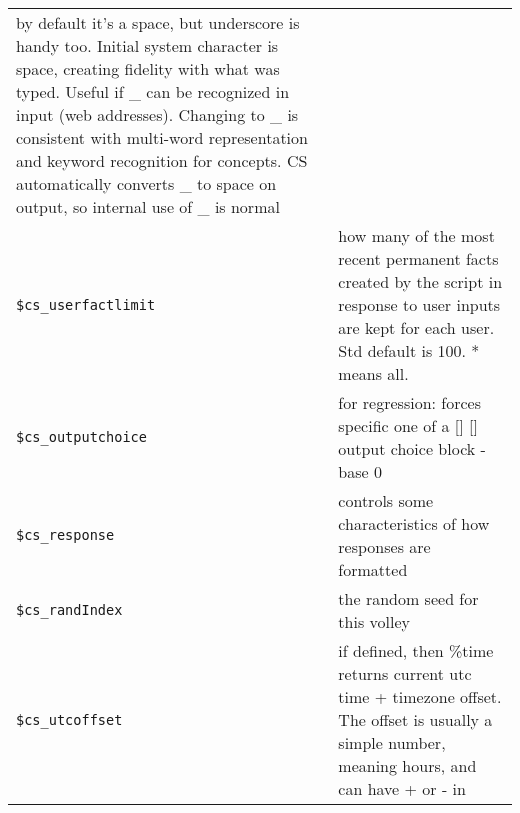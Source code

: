 \documentclass[]{article}
\begin{document}
\begin{longtable}[]{@{}ll@{}}
\begin{minipage}[t]{0.10\columnwidth}
by default it's a space, but underscore is handy too. Initial system
character is space, creating fidelity with what was typed. Useful if \_
can be recognized in input (web addresses). Changing to \_ is consistent
with multi-word representation and keyword recognition for concepts. CS
automatically converts \_ to space on output, so internal use of \_ is
normal\strut
\end{minipage}\tabularnewline
\begin{minipage}[t]{0.26\columnwidth}\raggedright\strut
\texttt{\$cs\_userfactlimit}\strut
\end{minipage} & \begin{minipage}[t]{0.10\columnwidth}\raggedright\strut
how many of the most recent permanent facts created by the script in
response to user inputs are kept for each user. Std default is 100. *
means all.\strut
\end{minipage}\tabularnewline
\begin{minipage}[t]{0.26\columnwidth}\raggedright\strut
\texttt{\$cs\_outputchoice}\strut
\end{minipage} & \begin{minipage}[t]{0.10\columnwidth}\raggedright\strut
for regression: forces specific one of a {[}{]} {[}{]} output choice
block - base 0\strut
\end{minipage}\tabularnewline
\begin{minipage}[t]{0.26\columnwidth}\raggedright\strut
\texttt{\$cs\_response}\strut
\end{minipage} & \begin{minipage}[t]{0.10\columnwidth}\raggedright\strut
controls some characteristics of how responses are formatted\strut
\end{minipage}\tabularnewline
\begin{minipage}[t]{0.26\columnwidth}\raggedright\strut
\texttt{\$cs\_randIndex}\strut
\end{minipage} & \begin{minipage}[t]{0.10\columnwidth}\raggedright\strut
the random seed for this volley\strut
\end{minipage}\tabularnewline
\begin{minipage}[t]{0.26\columnwidth}\raggedright\strut
\texttt{\$cs\_utcoffset}\strut
\end{minipage} & \begin{minipage}[t]{0.10\columnwidth}\raggedright\strut
if defined, then \%time returns current utc time + timezone offset. The
offset is usually a simple number, meaning hours, and can have + or - in

\end{minipage}
\end{longtable}
\end{document}
